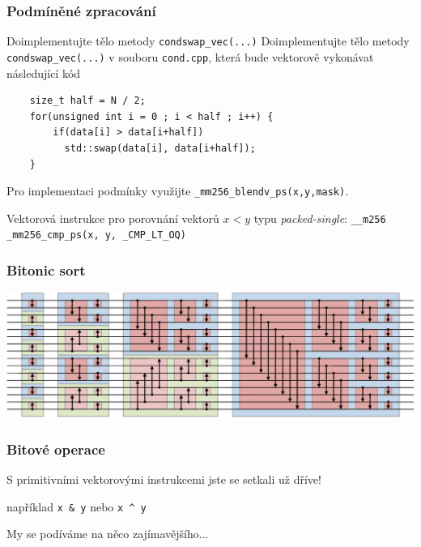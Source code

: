 \documentclass[usenames,dvipsnames,9pt]{beamer}
\begin{document}
\begin{frame}[fragile]
  \frametitle{Podmíněné zpracování}

  \begin{block}{Doimplementujte tělo metody \texttt{condswap\_vec(...)}}
    Doimplementujte tělo metody \texttt{condswap\_vec(...)} v souboru \texttt{cond.cpp}, která bude vektorově vykonávat následující kód
    \begin{verbatim}
    size_t half = N / 2;
    for(unsigned int i = 0 ; i < half ; i++) {
        if(data[i] > data[i+half])
          std::swap(data[i], data[i+half]);
    }
    \end{verbatim}
    Pro implementaci podmínky využijte \texttt{_mm256_blendv_ps(x,y,mask)}.
  \end{block}

  \vspace{1.5em}

  Vektorová instrukce pro porovnání vektorů $x < y$ typu \emph{packed-single}:
  \texttt{__m256 _mm256_cmp_ps(x, y, _CMP_LT_OQ)}
\end{frame}

\begin{frame}
  \frametitle{Bitonic sort}
  \includegraphics[width=\linewidth]{figs/bitonic.pdf}
\end{frame}

\begin{frame}
  \frametitle{Bitové operace}

  \begin{center}
    \Large S primitivními vektorovými instrukcemi jste se setkali už dříve!

    \normalsize například \texttt{x & y} nebo \texttt{x ^ y}
  \end{center}

  \vspace{3em}

  \pause
  \hfill My se podíváme na něco zajímavějšího...
\end{frame}
\end{document}
